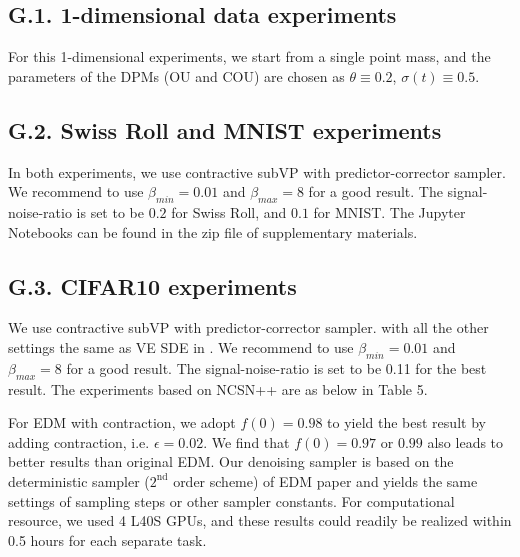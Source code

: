\documentclass[letterpaper,10pt,reqno]{amsart}
\numberwithin{equation}{section}
\begin{document}
\subsection*{G.1. 1-dimensional data experiments}
For this 1-dimensional experiments, we start from a single point mass, 
and the parameters of the DPMs (OU and COU) are chosen as $\theta\equiv 0.2$, $\sigma(t)\equiv 0.5$. 

\subsection*{G.2. Swiss Roll and MNIST experiments}
In both experiments, 
we use contractive subVP with predictor-corrector sampler. 
We recommend to use $\beta_{min}=0.01$ and $\beta_{max}=8$ for a good result. The signal-noise-ratio is set to be $0.2$ for Swiss Roll,
and $0.1$ for MNIST. 
The Jupyter Notebooks can be found in the zip file of supplementary materials.

\subsection*{G.3. CIFAR10 experiments}
We use contractive subVP with predictor-corrector sampler. with all the other settings the same as VE SDE in \cite{Song20}. We recommend to use $\beta_{min}=0.01$ and $\beta_{max}=8$ for a good result.
The signal-noise-ratio is set to be 0.11 for the best result. 
The experiments based on NCSN++ \cite{Song20} are as below in Table 5.

\quad For EDM \cite{karras2022elucidating} with contraction, we adopt $f(0)=0.98$ to yield the best result by adding contraction, i.e. $\epsilon=0.02$. We find that $f(0)=0.97$ or $0.99$ also leads to better results than original EDM. Our denoising sampler is based on the deterministic sampler ($2^{\text{nd}}$ order scheme) of EDM paper and yields the same settings of sampling steps or other sampler constants. For computational resource, we used 4 L40S GPUs, and these results could readily be realized within 0.5 hours for each separate task.
\end{document}
